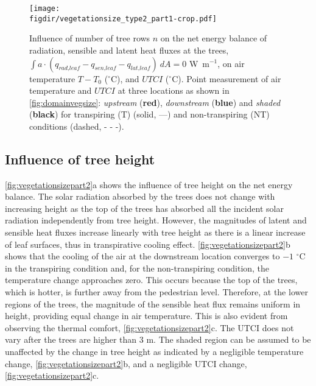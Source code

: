 	\begin{sidewaysfigure}[p]
	\centering
	\texttt{[image: \\figdir/vegetationsize\_type2\_part1-crop.pdf]}
	\caption{Influence of number of tree rows $n$ on  the net energy balance of radiation, sensible and latent heat fluxes at the trees, $\int a \cdot (q_{\textit{rad,leaf}}-q_{\textit{sen,leaf}}-q_{\textit{lat,leaf}})\ dA = 0$ W~m$^{-1}$,  on air temperature $T-T_0$ ($^{\circ}$C), and  $\textit{UTCI}$ ($^{\circ}$C). Point measurement of air temperature and $UTCI$ at three locations as shown in \cref{fig:domainvegsize}: \textit{upstream} ({\color{flatuidarkred}\textbf{red}}), \textit{downstream} ({\color{flatuidarkblue}\textbf{blue}}) and \textit{shaded} (\textbf{black}) for transpiring (T) (solid, ---) and non-transpiring (NT) conditions (dashed, - - -).}
	\label{fig:vegetationsizepart1}
	\end{sidewaysfigure}

\subsection{Influence of tree height}

\cref{fig:vegetationsizepart2}a shows the influence of tree height on the net energy balance. The solar radiation absorbed by the trees does not change with increasing height as the top of the trees has absorbed all the incident solar radiation independently from tree height. However, the magnitudes of latent and sensible heat fluxes increase linearly with tree height as there is a linear increase of leaf surfaces, thus in transpirative cooling effect. \cref{fig:vegetationsizepart2}b shows that the cooling of the air at the downstream location converges to $-1$ $^{\circ}$C in the transpiring condition and, for the non-transpiring condition, the temperature change approaches zero. This occurs because the top of the trees, which is hotter, is further away from the pedestrian level. Therefore, at the lower regions of the trees, the magnitude of the sensible heat flux remains uniform in height, providing equal change in air temperature. This is also evident from observing the thermal comfort, \cref{fig:vegetationsizepart2}c.  The UTCI does not vary after the trees are higher than $3$ m. The shaded region can be assumed to be unaffected by the change in tree height as indicated by a negligible temperature change, \cref{fig:vegetationsizepart2}b, and a negligible UTCI change, \cref{fig:vegetationsizepart2}c.  

